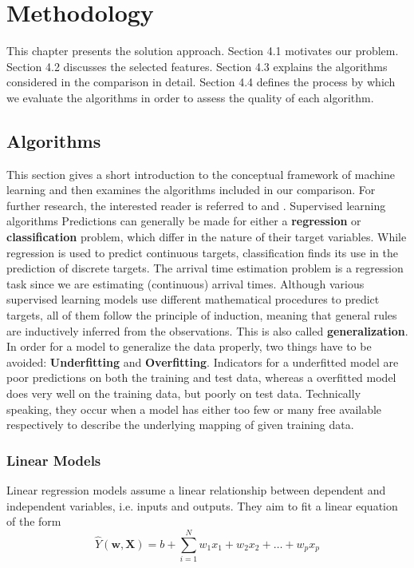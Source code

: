 \chapter{Methodology}
This chapter presents the solution approach.
Section 4.1 motivates our problem. 
Section 4.2 discusses the selected features.
Section 4.3 explains the algorithms considered in the comparison in detail.
Section 4.4 defines the process by which we evaluate the algorithms in order to assess the quality of each algorithm.


\section{Algorithms}
This section gives a short introduction to the conceptual framework of machine learning and then examines the algorithms included in our comparison. For further research, the interested reader is referred to \cite{Bishop} and \cite{SLFoundations}.
\newline
\newline
Supervised learning algorithms 
\newline
\newline
Predictions can generally be made for either a \textbf{regression} or \textbf{classification} problem, which differ in the nature of their target variables. While regression is used to predict continuous targets, classification finds its use in the prediction of discrete targets. The arrival time estimation problem is a regression task since we are estimating (continuous) arrival times.
Although various supervised learning models use different mathematical procedures to predict targets, all of them follow the principle of induction, meaning that general rules are inductively inferred from the observations. This is also called \textbf{generalization}.  
In order for a model to generalize the data properly, two things have to be avoided: \textbf{Underfitting} and \textbf{Overfitting}. Indicators for a underfitted model are poor predictions on both the training and test data, whereas a overfitted model does very well on the training data, but poorly on test data. Technically speaking, they occur when a model has either too few or many free available respectively to describe the underlying mapping of given training data. 

\subsection{Linear Models}
Linear regression models assume a linear relationship between dependent and independent variables, i.e. inputs and outputs. They aim to fit a linear equation of the form 
\begin{equation}
\hat Y(\mathbf{w},\mathbf{X}) = b + \sum_{i=1}^N w_1x_1 + w_2x_2 + \dots + w_px_p	
\end{equation}

